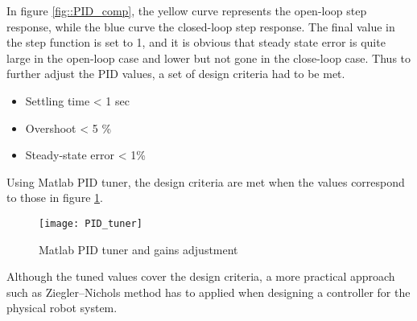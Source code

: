 In figure \ref{fig::PID_comp}, the yellow curve represents the open-loop step response, while the blue curve the closed-loop step response. The final value in the step function is set to 1, and it is obvious that steady state error is quite large in the open-loop case and lower but not gone in the close-loop case. Thus to further adjust the PID values, a set of design criteria had to be met.

\begin{itemize}
\item Settling time < 1 sec
\item Overshoot < 5 \%
\item Steady-state error < 1\%
\end{itemize} 

Using Matlab PID tuner, the design criteria are met when the values correspond to those in figure \ref{fig::PID_tuner}.

\begin{figure}[h]
\centering
\texttt{[image: PID\_tuner]}
\caption{Matlab PID tuner and gains adjustment}
\label{fig::PID_tuner}
\end{figure}

Although the tuned values cover the design criteria, a more practical approach such as Ziegler–Nichols method has to applied when designing a controller for the physical robot system. 